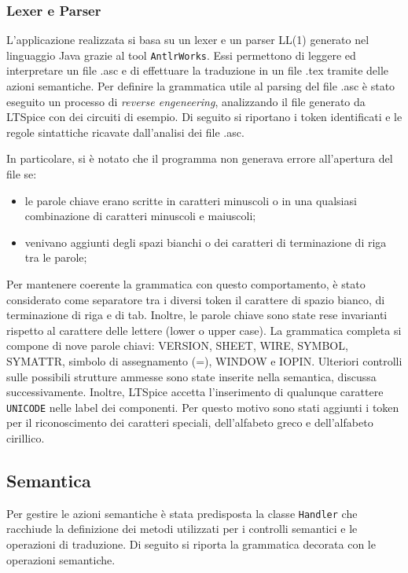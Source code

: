\clearpage
\subsubsection{Lexer e Parser}
L'applicazione realizzata si basa su un lexer e un parser LL(1) generato nel linguaggio Java grazie al tool \texttt{AntlrWorks}. Essi permettono di leggere ed interpretare un file .asc e di effettuare la traduzione in un file .tex tramite delle azioni semantiche. Per definire la grammatica utile al parsing del file .asc è stato eseguito un processo di \textit{reverse engeneering}, analizzando il file generato da LTSpice con dei circuiti di esempio. Di seguito si riportano i token identificati e le regole sintattiche ricavate dall'analisi dei file .asc.

In particolare, si è notato che il programma non generava errore all'apertura del file se:
\begin{itemize}
	\item le parole chiave erano scritte in caratteri minuscoli o in una qualsiasi combinazione di caratteri minuscoli e maiuscoli;
	\item venivano aggiunti degli spazi bianchi o dei caratteri di terminazione di riga tra le parole;
\end{itemize}
Per mantenere coerente la grammatica con questo comportamento, è stato considerato come separatore tra i diversi token il carattere di spazio bianco, di terminazione di riga e di tab. Inoltre, le parole chiave sono state rese invarianti rispetto al carattere delle lettere (lower o upper case). La grammatica completa si compone di nove parole chiavi: VERSION, SHEET, WIRE, SYMBOL, SYMATTR, simbolo di assegnamento (=), WINDOW e IOPIN. Ulteriori controlli sulle possibili strutture ammesse sono state inserite nella semantica, discussa successivamente. Inoltre, LTSpice accetta l'inserimento di qualunque carattere \texttt{UNICODE} nelle label dei componenti. Per questo motivo sono stati aggiunti i token per il riconoscimento dei caratteri speciali, dell'alfabeto greco e dell'alfabeto cirillico.

\subsection{Semantica}
Per gestire le azioni semantiche è stata predisposta la classe \texttt{Handler} che racchiude la definizione dei metodi utilizzati per i controlli semantici e le operazioni di traduzione. Di seguito si riporta la grammatica decorata con le operazioni semantiche.


